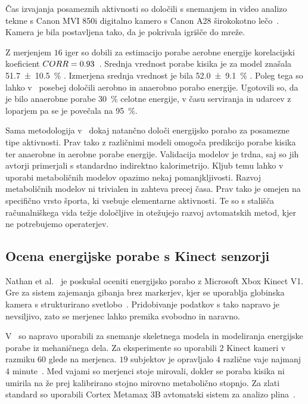 Čas izvajanja posameznih aktivnosti so določili s snemanjem in video analizo tekme s Canon MVI 850i digitalno kamero s Canon A28 širokokotno lečo~\cite{botton2011energy}. Kamera je bila postavljena %
tako, da je pokrivala igrišče do mreže. 

Z merjenjem $16$ iger so dobili za estimacijo porabe aerobne energije korelacijski koeficient ${CORR} =\num{0.93}$~\cite{botton2011energy}. Srednja vrednost porabe kisika je za model znašala \SI{51.7 \pm 10.5}{\%} \vomax. Izmerjena srednja vrednost je bila \SI{52.0 \pm 9.1}{\%} \vomax. Poleg tega so lahko 
v~\cite{botton2011energy} posebej določili aerobno in anaerobno porabo energije. Ugotovili so, da je bilo anaerobne porabe \SI{30}{\%} celotne energije, v času serviranja in udarcev z loparjem pa se je povečala na \SI{95}{\%}.  

Sama metodologija v~\cite{botton2011energy} dokaj natančno določi energijsko porabo za posamezne tipe aktivnosti. Prav tako z različnimi modeli omogoča predikcijo porabe kisika ter anaerobne in aerobne porabe energije. Validacija modelov je trdna, saj so jih avtorji primerjali s standardno indirektno kalorimetrijo. Kljub temu lahko v uporabi metaboličnih modelov opazimo nekaj pomanjkljivosti. Razvoj metaboličnih modelov ni trivialen in zahteva precej časa. Prav tako je omejen na specifično vrsto športa, ki vsebuje elementarne aktivnosti. Te so s stališča računalniškega vida težje določljive in otežujejo razvoj avtomatskih metod, kjer ne potrebujemo operaterjev.




\subsection{Ocena energijske porabe s Kinect senzorji}

Nathan et al.~\cite{nathan2015estimating} je poskušal oceniti energijsko porabo z Microsoft Xbox Kinect V1. Gre za sistem zajemanja gibanja brez markerjev, kjer se uporablja globinska kamera s strukturirano svetlobo~\cite{nathan2015estimating}. Pridobivanje podatkov s tako napravo je nevsiljivo, zato se merjenec lahko premika svobodno in naravno. 

V~\cite{nathan2015estimating} so napravo uporabili za snemanje skeletnega modela in modeliranja energijske porabe iz mehaničnega dela. Za eksperimente so uporabili $2$ Kinect kameri v razmiku \SI{60}{\stopinj} glede na merjenca. $19$ subjektov je opravljalo $4$ različne vaje najmanj $4$ minute~\cite{nathan2015estimating}. Med vajami so merjenci stoje mirovali, dokler se poraba kisika ni umirila na že prej kalibrirano stojno mirovno metabolično stopnjo. Za zlati standard so uporabili Cortex Metamax 3B avtomatski sistem za analizo plina~\cite{nathan2015estimating}.

